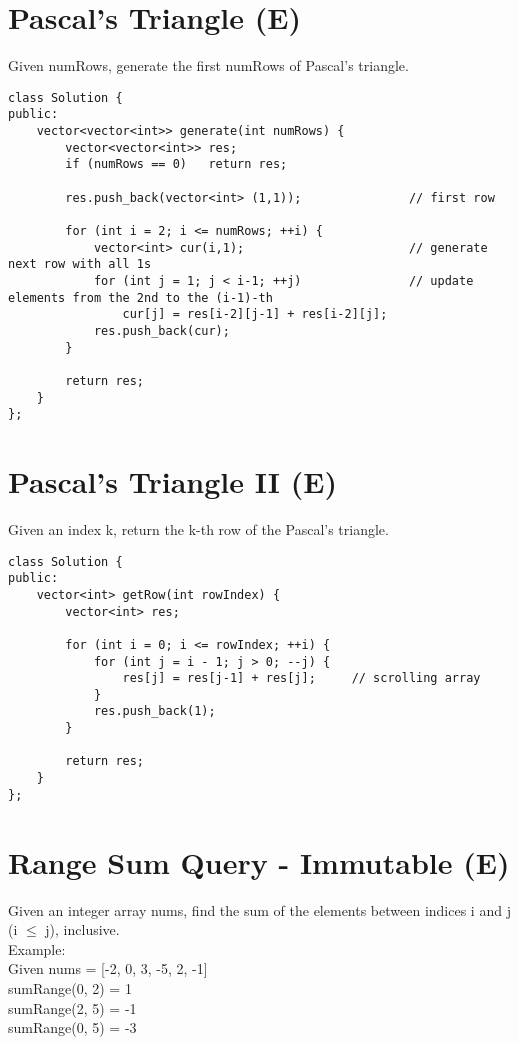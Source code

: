 \section{Pascal's Triangle (E)}
Given numRows, generate the first numRows of Pascal's triangle. \\

\begin{lstlisting}
class Solution {
public:
    vector<vector<int>> generate(int numRows) {
        vector<vector<int>> res;
        if (numRows == 0)   return res;
        
        res.push_back(vector<int> (1,1));               // first row
        
        for (int i = 2; i <= numRows; ++i) {
            vector<int> cur(i,1);                       // generate next row with all 1s
            for (int j = 1; j < i-1; ++j)               // update elements from the 2nd to the (i-1)-th 
                cur[j] = res[i-2][j-1] + res[i-2][j];
            res.push_back(cur);
        }
        
        return res;
    }
};
\end{lstlisting}


\section{Pascal's Triangle II (E)}
Given an index k, return the k-th row of the Pascal's triangle. \\

\begin{lstlisting}
class Solution {
public:
    vector<int> getRow(int rowIndex) {
        vector<int> res;
        
        for (int i = 0; i <= rowIndex; ++i) {
            for (int j = i - 1; j > 0; --j) {
                res[j] = res[j-1] + res[j];     // scrolling array
            }
            res.push_back(1);
        }
        
        return res;
    }
};
\end{lstlisting}


\section{Range Sum Query - Immutable (E)}
Given an integer array nums, find the sum of the elements between indices i and j (i $\leq$ j), inclusive.\\

Example: \\
Given nums = [-2, 0, 3, -5, 2, -1]\\
sumRange(0, 2) = 1\\
sumRange(2, 5) = -1\\
sumRange(0, 5) = -3\\

